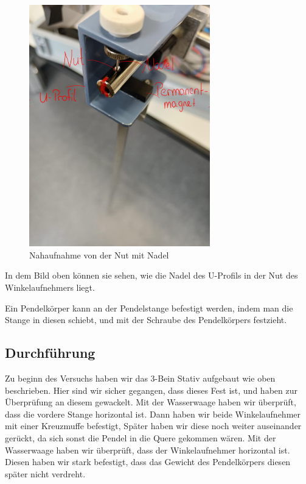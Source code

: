 \documentclass[twoside]{protokoll}
\begin{document}
\begin{figure}[H]
    \centering
    \includegraphics[width=0.7\textwidth]{Bilder/Nahaufnahme-Nut_B.pdf}
    \caption{Nahaufnahme von der Nut mit Nadel}
\end{figure}
In dem Bild oben können sie sehen, wie die Nadel des U-Profils in der Nut des Winkelaufnehmers liegt.

Ein Pendelkörper kann an der Pendelstange befestigt werden, indem man die Stange in diesen schiebt, und mit der Schraube des Pendelkörpers festzieht.\\
\subsection{Durchführung}
Zu beginn des Versuchs haben wir das 3-Bein Stativ aufgebaut wie oben beschrieben. 
Hier sind wir sicher gegangen, dass dieses Fest ist, und haben zur Überprüfung an diesem gewackelt.
Mit der Wasserwaage haben wir überprüft, dass die vordere Stange horizontal ist. 
Dann haben wir beide Winkelaufnehmer mit einer Kreuzmuffe befestigt, Später haben wir diese noch weiter auseinander gerückt, da sich sonst die Pendel in die Quere gekommen wären. 
Mit der Wasserwaage haben wir überprüft, dass der Winkelaufnehmer horizontal ist. 
Diesen haben wir stark befestigt, dass das Gewicht des Pendelkörpers diesen später nicht verdreht.
 
\end{document}
